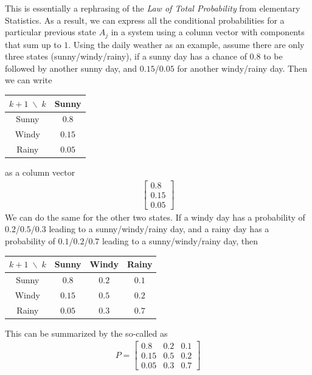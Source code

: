 This is essentially a rephrasing of the \textit{Law of Total Probability} from elementary Statistics. As a result, we can express all the conditional probabilities  for a particular previous state $A_j$ in a system using a column vector with components that sum up to $1$. Using the daily weather as an example, assume there are only three states (sunny/windy/rainy), if a sunny day has a chance of $0.8$ to be followed by another sunny day, and $0.15$/$0.05$ for another windy/rainy day. Then we can write
\begin{center}
\begin{tabular}{|c|c|}
\hline
$k+1 \; \backslash \; k$ & Sunny \\
\hline
Sunny & $0.8$ \\
\hline
Windy & $0.15$ \\
\hline 
Rainy & $0.05$ \\
\hline
\end{tabular}
\end{center}
as a column vector
\begin{align*}
\begin{bmatrix}
0.8 \\
0.15 \\
0.05
\end{bmatrix}
\end{align*}
We can do the same for the other two states. If a windy day has a probability of $0.2$/$0.5$/$0.3$ leading to a sunny/windy/rainy day, and a rainy day has a probability of $0.1$/$0.2$/$0.7$ leading to a sunny/windy/rainy day, then
\begin{center}
\begin{tabular}{|c|c|c|c|}
\hline
$k+1 \; \backslash \; k$ & Sunny & Windy & Rainy \\
\hline
Sunny & $0.8$ & $0.2$ & $0.1$\\
\hline
Windy & $0.15$ & $0.5$ & $0.2$ \\
\hline 
Rainy & $0.05$ & $0.3$ & $0.7$ \\
\hline
\end{tabular}
\end{center}
This can be summarized by the so-called  as
\begin{align*}
P = 
\begin{bmatrix}
0.8 & 0.2 & 0.1\\
0.15 & 0.5 & 0.2 \\
0.05 & 0.3 & 0.7
\end{bmatrix}
\end{align*}
